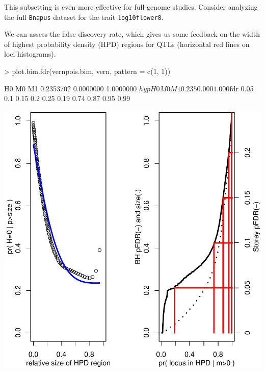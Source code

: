\documentclass{article}
\begin{document}
\noindent This subsetting is even more effective for full-genome
studies. Consider analyzing the full \texttt{Bnapus} dataset for the
trait \texttt{log10flower8}.

We can assess the false discovery rate, which gives us some feedback
on the width of highest probability density (HPD) regions for QTLs
(horizontal red lines on loci histograms).

\begin{Schunk}
\begin{Sinput}
> plot.bim.fdr(vernpois.bim, vern, pattern = c(1, 1))
\end{Sinput}
\begin{Soutput}
       H0        M0        M1 
0.2353702 0.0000000 1.0000000 
$hyp
   H0    M0    M1 
0.235 0.000 1.000 

$fdr
0.05  0.1 0.15  0.2 0.25 
0.19 0.74 0.87 0.95 0.99 
\end{Soutput}
\end{Schunk}
\includegraphics{bim_summary-012}
\end{document}
